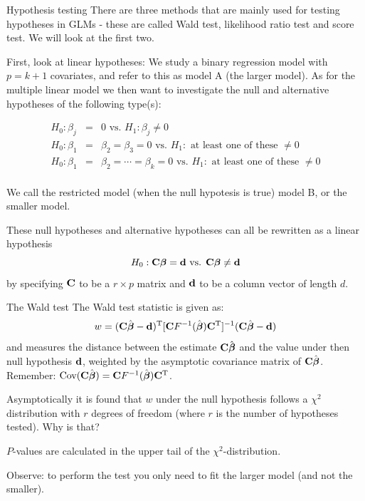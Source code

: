 \documentclass[
  ignorenonframetext,
]{beamer}
\begin{document}
\begin{frame}
\begin{block}{Hypothesis testing}
\protect\hypertarget{hypothesis-testing}{}
There are three methods that are mainly used for testing hypotheses in
GLMs - these are called Wald test, likelihood ratio test and score test.
We will look at the first two.

First, look at linear hypotheses: We study a binary regression model
with \(p=k+1\) covariates, and refer to this as model A (the larger
model). As for the multiple linear model we then want to investigate the
null and alternative hypotheses of the following type(s):

\begin{eqnarray*}
 H_0: \beta_{j}&=&0 \text{ vs. } H_1:\beta_j\neq 0\\
 H_0: \beta_{1}&=&\beta_{2}=\beta_{3}=0 \text{ vs. } H_1:\text{ at least one of these }\neq 0\\
 H_0: \beta_{1}&=&\beta_{2}=\cdots=\beta_{k}=0 \text{ vs. } H_1:\text{ at least one of these }\neq 0\\
 \end{eqnarray*}
\end{block}
\end{frame}

\begin{frame}
We call the restricted model (when the null hypotesis is true) model B,
or the smaller model.

These null hypotheses and alternative hypotheses can all be rewritten as
a linear hypothesis
\[H_0: {\bf C}{\bf \boldsymbol{\beta}}={\bf d} \text{ vs. } {\bf C}{\bf \boldsymbol{\beta}}\neq {\bf d} \]
by specifying \({\bf C}\) to be a \(r \times p\) matrix and \({\bf d}\)
to be a column vector of length \(d\).
\end{frame}

\begin{frame}
\begin{block}{The Wald test}
\protect\hypertarget{the-wald-test}{}
The Wald test statistic is given as:
\[w=({\bf C}\hat{{\bf \boldsymbol{\beta}}}-{\bf d})^{\text T}[{\bf C}F^{-1}(\hat{\boldsymbol{\beta}}){\bf C}^{\text T}]^{-1}({\bf C}\hat{{\bf \boldsymbol{\beta}}}-{\bf d}) \]
and measures the distance between the estimate
\({\bf C}\hat{\boldsymbol{\beta}}\) and the value under then null
hypothesis \({\bf d}\), weighted by the asymptotic covariance matrix of
\({\bf C}\hat{\boldsymbol{\beta}}\). Remember:
\(\text{Cov}({\bf C}\hat{\boldsymbol{\beta}})={\bf C}F^{-1}(\hat{\boldsymbol{\beta}}){\bf C}^{\text T}\).

Asymptotically it is found that \(w\) under the null hypothesis follows
a \(\chi^2\) distribution with \(r\) degrees of freedom (where \(r\) is
the number of hypotheses tested). Why is that?

\(P\)-values are calculated in the upper tail of the
\(\chi^2\)-distribution.

Observe: to perform the test you only need to fit the larger model (and
not the smaller).
\end{block}
\end{frame}
\end{document}
